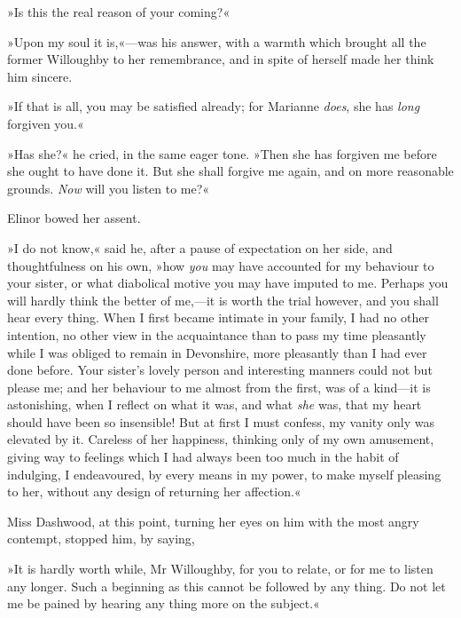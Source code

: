 »Is this the real reason of your coming?«

»Upon my soul it is,«—was his answer, with a warmth which brought all the former Willoughby to her remembrance, and in spite of herself made her think him sincere.

»If that is all, you may be satisfied already; for Marianne \textit{does}, she has \textit{long} forgiven you.«

»Has she?« he cried, in the same eager tone. »Then she has forgiven me before she ought to have done it. But she shall forgive me again, and on more reasonable grounds. \textit{Now} will you listen to me?«

Elinor bowed her assent.

»I do not know,« said he, after a pause of expectation on her side, and thoughtfulness on his own, »how \textit{you} may have accounted for my behaviour to your sister, or what diabolical motive you may have imputed to me. Perhaps you will hardly think the better of me,—it is worth the trial however, and you shall hear every thing. When I first became intimate in your family, I had no other intention, no other view in the acquaintance than to pass my time pleasantly while I was obliged to remain in Devonshire, more pleasantly than I had ever done before. Your sister’s lovely person and interesting manners could not but please me; and her behaviour to me almost from the first, was of a kind—it is astonishing, when I reflect on what it was, and what \textit{she} was, that my heart should have been so insensible! But at first I must confess, my vanity only was elevated by it. Careless of her happiness, thinking only of my own amusement, giving way to feelings which I had always been too much in the habit of indulging, I endeavoured, by every means in my power, to make myself pleasing to her, without any design of returning her affection.«

Miss Dashwood, at this point, turning her eyes on him with the most angry contempt, stopped him, by saying,

»It is hardly worth while, Mr Willoughby, for you to relate, or for me to listen any longer. Such a beginning as this cannot be followed by any thing. Do not let me be pained by hearing any thing more on the subject.«

